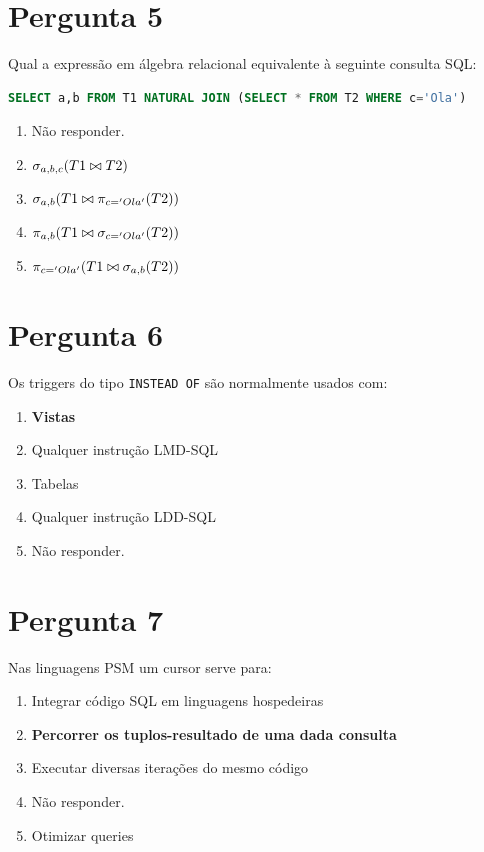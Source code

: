 \documentclass[type=normal, year=2014/15]{bdad_exam}
\begin{document}
{\newpage
\section{Pergunta 5}
Qual a expressão em álgebra relacional equivalente à seguinte consulta SQL:
\begin{lstlisting}[language=SQL]
SELECT a,b FROM T1 NATURAL JOIN (SELECT * FROM T2 WHERE c='Ola')
\end{lstlisting}
\begin{enumerate}[label=\alph*.]\itemsep0em
    \item Não responder.
    \item $\sigma_{a,b,c}(T1 \bowtie T2)$
    \item $\sigma_{a,b}(T1 \bowtie \pi_{c='Ola'}(T2))$
    \item \textbf{$\pi_{a,b}(T1 \bowtie \sigma_{c='Ola'}(T2))$ \greencheckmark}
    \item $\pi_{c='Ola'}(T1 \bowtie \sigma_{a,b}(T2))$
\end{enumerate}

\section{Pergunta 6}
Os triggers do tipo \texttt{INSTEAD OF} são normalmente usados com:
\begin{enumerate}[label=\alph*.]\itemsep0em
    \item \textbf{Vistas \greencheckmark}
    \item Qualquer instrução LMD-SQL
    \item Tabelas
    \item Qualquer instrução LDD-SQL
    \item Não responder.
\end{enumerate}

\section{Pergunta 7}
Nas linguagens PSM um cursor serve para:
\begin{enumerate}[label=\alph*.]\itemsep0em
    \item Integrar código SQL em linguagens hospedeiras
    \item \textbf{Percorrer os tuplos-resultado de uma dada consulta \greencheckmark}
    \item Executar diversas iterações do mesmo código
    \item Não responder.
    \item Otimizar queries
\end{enumerate}

}
\end{document}

